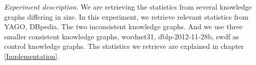 \documentclass[11pt,letterpaper ,oneside ]{book}
\begin{document}
	
	\textit{Experiment description}. We are retrieving the statistics from several knowledge graphs differing in size. In this experiment, we retrieve relevant statistics from YAGO, DBpedia. The two inconsistent knowledge graphs. And we use three smaller consistent knowledge graphs, wordnet31, dblp-2012-11-28b, swdf as control knowledge graphs. The statistics we retrieve are explained in chapter \ref{Implementation}.  \\
	\begin{figure}[!t]
	\end{figure}
	
\end{document}
